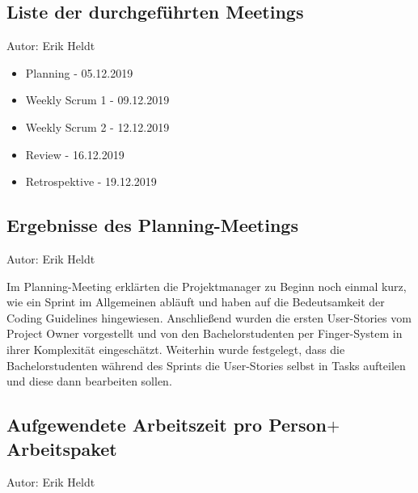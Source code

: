 \subsection{Liste der durchgeführten Meetings}
{\small Autor: Erik Heldt}

\begin{itemize}
	\item Planning - 05.12.2019
	\item Weekly Scrum 1 - 09.12.2019
	\item Weekly Scrum 2 - 12.12.2019
	\item Review - 16.12.2019
	\item Retrospektive - 19.12.2019
\end{itemize}

\subsection{Ergebnisse des Planning-Meetings}
{\small Autor: Erik Heldt}

Im Planning-Meeting erklärten die Projektmanager zu Beginn noch einmal kurz, wie ein Sprint im Allgemeinen abläuft und haben auf die Bedeutsamkeit der Coding Guidelines hingewiesen. Anschließend wurden die ersten User-Stories vom Project Owner vorgestellt und von den Bachelorstudenten per Finger-System in ihrer Komplexität eingeschätzt. Weiterhin wurde festgelegt, dass die Bachelorstudenten während des Sprints die User-Stories selbst in Tasks aufteilen und diese dann bearbeiten sollen.

\subsection{Aufgewendete Arbeitszeit pro Person$+$Arbeitspaket}
{\small Autor: Erik Heldt}

